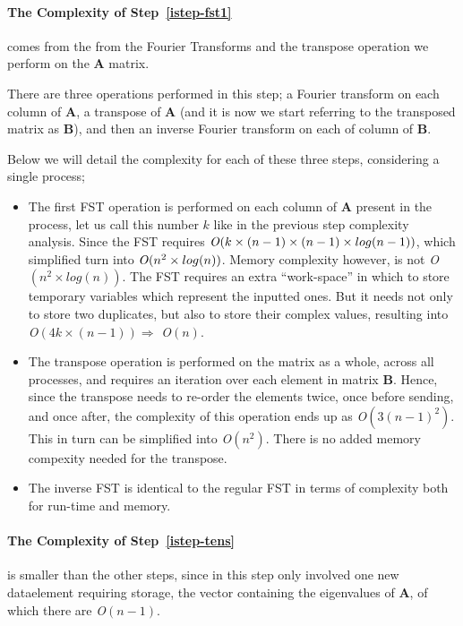 \documentclass[fontsize=11pt,paper=a4,titlepage]{article}
\begin{document}
\paragraph{The Complexity of Step~\ref{istep-fst1}} comes from the from the
Fourier Transforms and the transpose operation we perform on the $\mathbf{A}$
matrix.

There are three operations performed in this step; a Fourier transform on each
column of $\mathbf{A}$, a transpose of $\mathbf{A}$ (and it is now we start
referring to the transposed matrix as $\mathbf{B}$), and then an inverse Fourier
transform on each of column of $\mathbf{B}$.

Below we will detail the complexity for each of these three steps, considering a
single process;

\begin{itemize}
	\item The first FST operation is performed on each column of $\mathbf{A}$
	present in the process, let us call this number $k$ like in the previous
	step complexity analysis. Since the FST requires ${\it O}(k\times (n-1)
	\times (n-1)\times log(n-1))$, which simplified turn into ${\it O}(n^2
	\times log(n))$. Memory complexity however, is not {\it O}$(n^2\times log(n)
	)$. The FST requires an extra ``work-space'' in which to store temporary
	variables which represent the inputted ones. But it needs not only to store
	two duplicates, but also to store their complex values, resulting into {\it
	O}$(4k\times(n-1)) \Rightarrow$ {\it O}$(n)$.

	\item The transpose operation is performed on the matrix as a whole, across
	all processes, and requires an iteration over each element in matrix $
	\mathbf{B}$. Hence, since the transpose needs to re-order the elements
	twice, once before sending, and once after, the complexity of this operation
	ends up as {\it O}$(3(n-1)^2)$. This in turn can be simplified into
	{\it O}$(n^2)$. There is no added memory compexity needed for the transpose.

	\item The inverse FST is identical to the regular FST in terms of complexity
	both for run-time and memory.
\end{itemize}

\paragraph{The Complexity of Step~\ref{istep-tens}} is smaller than the other
steps, since in this step only involved one new dataelement requiring storage,
the vector containing the eigenvalues of $\mathbf{A}$, of which there are {\it
O}$(n-1)$.
\end{document}

